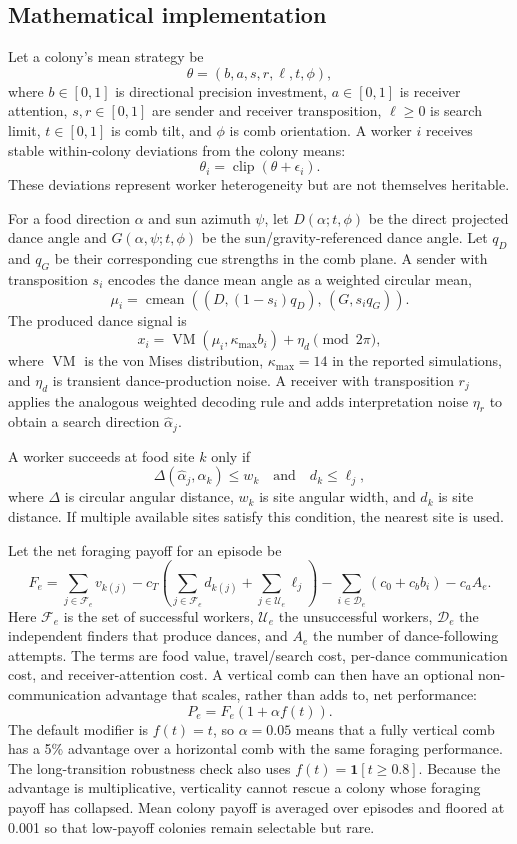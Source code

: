 \documentclass[11pt]{article}
\begin{document}
\subsection{Mathematical implementation}

Let a colony's mean strategy be
\[
\theta = (b, a, s, r, \ell, t, \phi),
\]
where $b \in [0,1]$ is directional precision investment, $a \in [0,1]$ is
receiver attention, $s,r \in [0,1]$ are sender and receiver transposition,
$\ell \geq 0$ is search limit, $t \in [0,1]$ is comb tilt, and $\phi$ is comb
orientation. A worker $i$ receives stable within-colony deviations from the
colony means:
\[
\theta_i = \operatorname{clip}(\theta + \epsilon_i).
\]
These deviations represent worker heterogeneity but are not themselves
heritable.

For a food direction $\alpha$ and sun azimuth $\psi$, let $D(\alpha;t,\phi)$ be
the direct projected dance angle and $G(\alpha,\psi;t,\phi)$ be the
sun/gravity-referenced dance angle. Let $q_D$ and $q_G$ be their corresponding
cue strengths in the comb plane. A sender with transposition $s_i$ encodes the
dance mean angle as a weighted circular mean,
\[
\mu_i =
\operatorname{cmean}\left(
  (D, (1-s_i)q_D),\,
  (G, s_i q_G)
\right).
\]
The produced dance signal is
\[
x_i =
\operatorname{VM}(\mu_i, \kappa_{\max} b_i) + \eta_d
\pmod{2\pi},
\]
where $\operatorname{VM}$ is the von Mises distribution, $\kappa_{\max}=14$ in
the reported simulations, and $\eta_d$ is transient dance-production noise.
A receiver with transposition $r_j$ applies the analogous weighted decoding
rule and adds interpretation noise $\eta_r$ to obtain a search direction
$\hat{\alpha}_j$.

A worker succeeds at food site $k$ only if
\[
\Delta(\hat{\alpha}_j,\alpha_k) \leq w_k
\quad\text{and}\quad
d_k \leq \ell_j,
\]
where $\Delta$ is circular angular distance, $w_k$ is site angular width, and
$d_k$ is site distance. If multiple available sites satisfy this condition, the
nearest site is used.

Let the net foraging payoff for an episode be
\[
F_e =
\sum_{j \in \mathcal{F}_e} v_{k(j)}
- c_T\left(\sum_{j \in \mathcal{F}_e} d_{k(j)}
  + \sum_{j \in \mathcal{U}_e} \ell_j\right)
- \sum_{i \in \mathcal{D}_e} (c_0 + c_b b_i)
- c_a A_e .
\]
Here $\mathcal{F}_e$ is the set of successful workers, $\mathcal{U}_e$ the
unsuccessful workers, $\mathcal{D}_e$ the independent finders that produce
dances, and $A_e$ the number of dance-following attempts. The terms are food
value, travel/search cost, per-dance communication cost, and receiver-attention
cost. A vertical comb can then have an optional non-communication advantage
that scales, rather than adds to, net performance:
\[
P_e = F_e \left(1 + \alpha f(t)\right).
\]
The default modifier is $f(t)=t$, so $\alpha=0.05$ means that a fully vertical
comb has a 5\% advantage over a horizontal comb with the same foraging
performance. The long-transition robustness check also uses
$f(t)=\mathbf{1}[t \geq 0.8]$. Because the advantage is multiplicative,
verticality cannot rescue a colony whose foraging payoff has collapsed. Mean
colony payoff is averaged over episodes and floored at 0.001 so that low-payoff
colonies remain selectable but rare.
\end{document}
